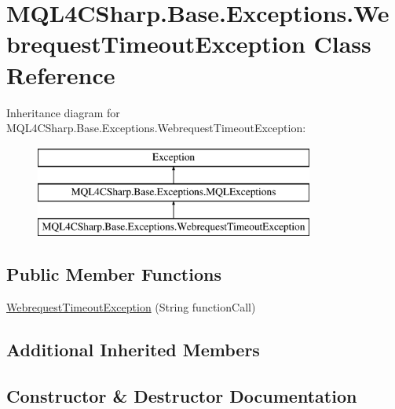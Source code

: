 \hypertarget{class_m_q_l4_c_sharp_1_1_base_1_1_exceptions_1_1_webrequest_timeout_exception}{}\section{M\+Q\+L4\+C\+Sharp.\+Base.\+Exceptions.\+Webrequest\+Timeout\+Exception Class Reference}
\label{class_m_q_l4_c_sharp_1_1_base_1_1_exceptions_1_1_webrequest_timeout_exception}
Inheritance diagram for M\+Q\+L4\+C\+Sharp.\+Base.\+Exceptions.\+Webrequest\+Timeout\+Exception\+:\begin{figure}[H]
\begin{center}
\leavevmode
\includegraphics[height=3.000000cm]{class_m_q_l4_c_sharp_1_1_base_1_1_exceptions_1_1_webrequest_timeout_exception}
\end{center}
\end{figure}
\subsection*{Public Member Functions}
\begin{DoxyCompactItemize}
\item 
\hyperlink{class_m_q_l4_c_sharp_1_1_base_1_1_exceptions_1_1_webrequest_timeout_exception_ac1338f5cd43b2bbc23b353f2c7ffd50c}{Webrequest\+Timeout\+Exception} (String function\+Call)
\end{DoxyCompactItemize}
\subsection*{Additional Inherited Members}


\subsection{Constructor \& Destructor Documentation}
